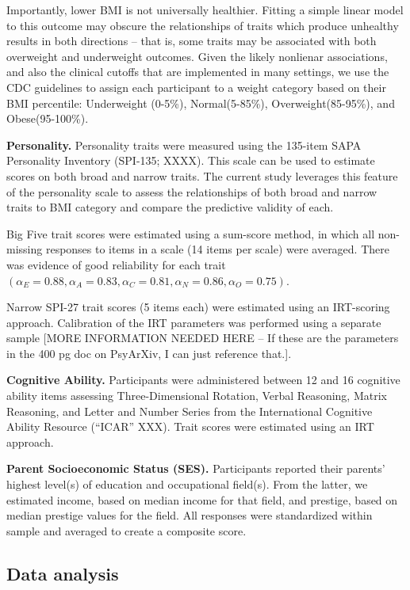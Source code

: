 \documentclass[man]{apa6}
\begin{document}
Importantly, lower BMI is not universally healthier. Fitting a simple linear model to this outcome may obscure the relationships of traits which produce unhealthy results in both directions -- that is, some traits may be associated with both overweight and underweight outcomes. Given the likely nonlienar associations, and also the clinical cutoffs that are implemented in many settings, we use the CDC guidelines to assign each participant to a weight category based on their BMI percentile: Underweight (0-5\%), Normal(5-85\%), Overweight(85-95\%), and Obese(95-100\%).

\textbf{Personality.} Personality traits were measured using the 135-item SAPA Personality Inventory (SPI-135; XXXX). This scale can be used to estimate scores on both broad and narrow traits. The current study leverages this feature of the personality scale to assess the relationships of both broad and narrow traits to BMI category and compare the predictive validity of each.

Big Five trait scores were estimated using a sum-score method, in which all non-missing responses to items in a scale (14 items per scale) were averaged. There was evidence of good reliability for each trait \(( \alpha_E = 0.88, \alpha_A = 0.83, \alpha_C = 0.81, \alpha_N = 0.86, \alpha_O = 0.75)\).

Narrow SPI-27 trait scores (5 items each) were estimated using an IRT-scoring approach. Calibration of the IRT parameters was performed using a separate sample {[}MORE INFORMATION NEEDED HERE -- If these are the parameters in the 400 pg doc on PsyArXiv, I can just reference that.{]}.

\textbf{Cognitive Ability.} Participants were administered between 12 and 16 cognitive ability items assessing Three-Dimensional Rotation, Verbal Reasoning, Matrix Reasoning, and Letter and Number Series from the International Cognitive Ability Resource (\enquote{ICAR} XXX). Trait scores were estimated using an IRT approach.

\textbf{Parent Socioeconomic Status (SES).} Participants reported their parents' highest level(s) of education and occupational field(s). From the latter, we estimated income, based on median income for that field, and prestige, based on median prestige values for the field. All responses were standardized within sample and averaged to create a composite score.

\hypertarget{data-analysis}{%
\subsection{Data analysis}\label{data-analysis}}
\end{document}
